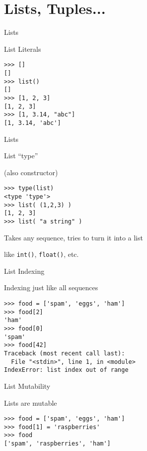 \documentclass{beamer}
\begin{document}
\section{Lists, Tuples...}

\begin{frame}[fragile]{Lists}

 {\Large List Literals}

\begin{verbatim}
>>> []
[]
>>> list()
[]
>>> [1, 2, 3]
[1, 2, 3]
>>> [1, 3.14, "abc"]
[1, 3.14, 'abc']
\end{verbatim}

\end{frame} 

\begin{frame}[fragile]{Lists}

 {\Large List ``type''}

 {\large \hspace{0.1in}(also constructor)}

\begin{verbatim}
>>> type(list)
<type 'type'>
>>> list( (1,2,3) )
[1, 2, 3]
>>> list( "a string" )
\end{verbatim}

\vfill
{\Large Takes any sequence, tries to turn it into a list}

\vfill
{\large like \verb|int()|, \verb|float()|, etc.}


\end{frame} 


\begin{frame}[fragile]{List Indexing}

 {\Large Indexing just like all sequences}

\begin{verbatim}
>>> food = ['spam', 'eggs', 'ham']
>>> food[2]
'ham'
>>> food[0]
'spam'
>>> food[42]
Traceback (most recent call last):
  File "<stdin>", line 1, in <module>
IndexError: list index out of range
\end{verbatim}

\end{frame} 

\begin{frame}[fragile]{List Mutability}

{\Large Lists are mutable}

\begin{verbatim}
>>> food = ['spam', 'eggs', 'ham']
>>> food[1] = 'raspberries'
>>> food
['spam', 'raspberries', 'ham']
\end{verbatim}

\end{frame} 
\end{document}
